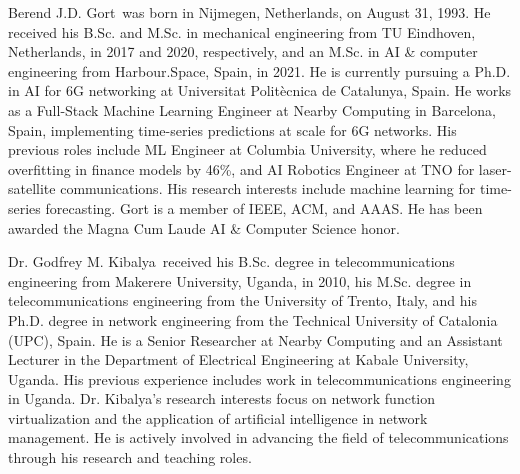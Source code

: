 \documentclass{ieeetmlcn}
\begin{document}
\begin{IEEEbiography}
{Berend J.D. Gort}~was born in Nijmegen, Netherlands, on August 31, 1993. He received his B.Sc. and M.Sc. in mechanical engineering from TU Eindhoven, Netherlands, in 2017 and 2020, respectively, and an M.Sc. in AI \& computer engineering from Harbour.Space, Spain, in 2021. He is currently pursuing a Ph.D. in AI for 6G networking at Universitat Politècnica de Catalunya, Spain. He works as a Full-Stack Machine Learning Engineer at Nearby Computing in Barcelona, Spain, implementing time-series predictions at scale for 6G networks. His previous roles include ML Engineer at Columbia University, where he reduced overfitting in finance models by 46\%, and AI Robotics Engineer at TNO for laser-satellite communications. His research interests include machine learning for time-series forecasting. Gort is a member of IEEE, ACM, and AAAS. He has been awarded the Magna Cum Laude AI \& Computer Science honor.
\end{IEEEbiography}%


\begin{IEEEbiography}
{Dr. Godfrey M. Kibalya}~received his B.Sc. degree in telecommunications engineering from Makerere University, Uganda, in 2010, his M.Sc. degree in telecommunications engineering from the University of Trento, Italy, and his Ph.D. degree in network engineering from the Technical University of Catalonia (UPC), Spain. He is a Senior Researcher at Nearby Computing and an Assistant Lecturer in the Department of Electrical Engineering at Kabale University, Uganda. His previous experience includes work in telecommunications engineering in Uganda. Dr. Kibalya's research interests focus on network function virtualization and the application of artificial intelligence in network management. He is actively involved in advancing the field of telecommunications through his research and teaching roles.
\end{IEEEbiography}%
\end{document}
